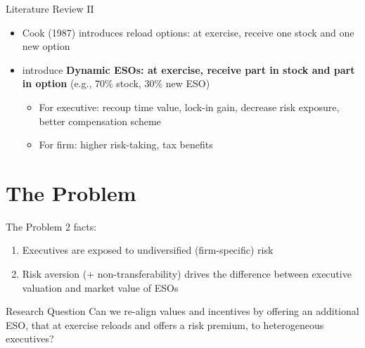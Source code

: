 \documentclass[compress]{beamer}
\begin{document}
\begin{frame}{Literature Review II}
    \begin{itemize}
        \item Cook (1987) introduces reload options: at exercise, receive one stock and one new option
        \item \citet{huang2013dynamic} introduce \textbf{Dynamic ESOs: at exercise, receive part in stock and part in option} (e.g., 70\% stock, 30\% new ESO)
        \begin{itemize}
            \item For executive: recoup time value, lock-in gain, decrease risk exposure, better compensation scheme
            \item For firm: higher risk-taking, tax benefits
        \end{itemize}
    \end{itemize}
\end{frame}


\section{The Problem}
\begin{frame}{The Problem}
    2 facts:
    \begin{enumerate}
        \item Executives are exposed to undiversified (firm-specific) risk
        \item Risk aversion (+ non-transferability) drives the difference between executive valuation and market value of ESOs
    \end{enumerate}
    \vspace*{10pt}
    \pause
    \begin{block}{Research Question}
        Can we re-align values and incentives by offering an additional ESO, that at exercise reloads and offers a risk premium, to heterogeneous executives?
    \end{block}  
\end{frame}
\end{document}
